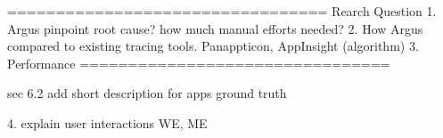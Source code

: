 =================================
Rearch Question
	1. Argus pinpoint root cause? how much manual efforts needed?
	2. How Argus compared to existing tracing tools. Panappticon, AppInsight (algorithm) 
	3. Performance
================================

sec 6.2
add short description for apps ground truth 

4. explain user interactions WE, ME
